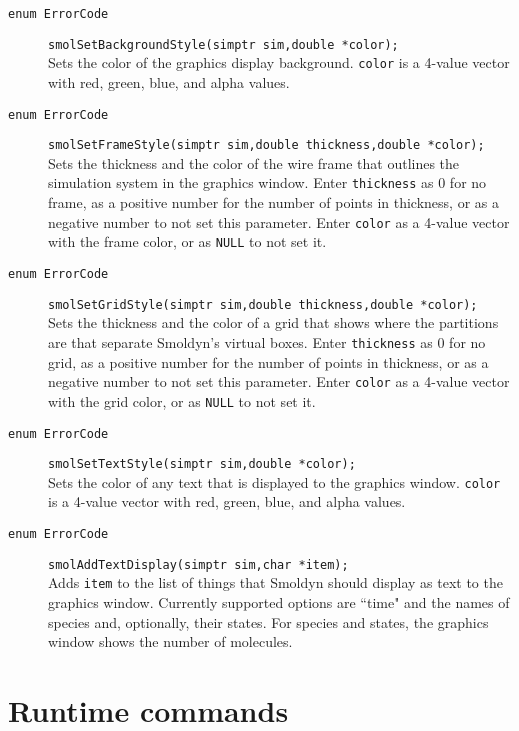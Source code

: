 \documentclass {book}
\begin{document}
\begin{description}
\item[\texttt{enum ErrorCode}]
\texttt{smolSetBackgroundStyle(simptr sim,double *color);}
\hfill \\
Sets the color of the graphics display background.  \texttt{color} is a 4-value vector with red, green, blue, and alpha values.

\item[\texttt{enum ErrorCode}]
\texttt{smolSetFrameStyle(simptr sim,double thickness,double *color);}
\hfill \\
Sets the thickness and the color of the wire frame that outlines the simulation system in the graphics window.  Enter \texttt{thickness} as 0 for no frame, as a positive number for the number of points in thickness, or as a negative number to not set this parameter.  Enter \texttt{color} as a 4-value vector with the frame color, or as \texttt{NULL} to not set it.

\item[\texttt{enum ErrorCode}]
\texttt{smolSetGridStyle(simptr sim,double thickness,double *color);}
\hfill \\
Sets the thickness and the color of a grid that shows where the partitions are that separate Smoldyn's virtual boxes.  Enter \texttt{thickness} as 0 for no grid, as a positive number for the number of points in thickness, or as a negative number to not set this parameter.  Enter \texttt{color} as a 4-value vector with the grid color, or as \texttt{NULL} to not set it.

\item[\texttt{enum ErrorCode}]
\texttt{smolSetTextStyle(simptr sim,double *color);}
\hfill \\
Sets the color of any text that is displayed to the graphics window.  \texttt{color} is a 4-value vector with red, green, blue, and alpha values.

\item[\texttt{enum ErrorCode}]
\texttt{smolAddTextDisplay(simptr sim,char *item);}
\hfill \\
Adds \texttt{item} to the list of things that Smoldyn should display as text to the graphics window.  Currently supported options are ``time" and the names of species and, optionally, their states.  For species and states, the graphics window shows the number of molecules.

\end{description}


\section{Runtime commands}
\end{document}
